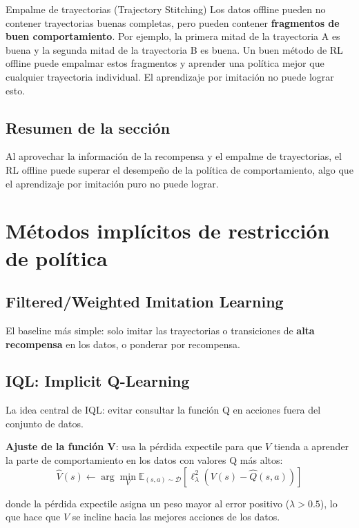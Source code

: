\documentclass[a4paper]{article}
\begin{document}
\begin{importantbox}{Empalme de trayectorias (Trajectory Stitching)}
Los datos offline pueden no contener trayectorias buenas completas, pero pueden contener \textbf{fragmentos de buen comportamiento}. Por ejemplo, la primera mitad de la trayectoria A es buena y la segunda mitad de la trayectoria B es buena. Un buen método de RL offline puede empalmar estos fragmentos y aprender una política mejor que cualquier trayectoria individual. El aprendizaje por imitación no puede lograr esto.
\end{importantbox}

\subsection{Resumen de la sección}

Al aprovechar la información de la recompensa y el empalme de trayectorias, el RL offline puede superar el desempeño de la política de comportamiento, algo que el aprendizaje por imitación puro no puede lograr.

\section{Métodos implícitos de restricción de política}

\subsection{Filtered/Weighted Imitation Learning}

El baseline más simple: solo imitar las trayectorias o transiciones de \textbf{alta recompensa} en los datos, o ponderar por recompensa.

\subsection{IQL: Implicit Q-Learning}

La idea central de IQL: evitar consultar la función Q en acciones fuera del conjunto de datos.

\textbf{Ajuste de la función V}: usa la pérdida expectile para que $V$ tienda a aprender la parte de comportamiento en los datos con valores Q más altos:
$$\hat{V}(s) \leftarrow \arg\min_{V} \mathbb{E}_{(s,a) \sim \mathcal{D}} \left[\ell_\lambda^2\left(V(s) - \hat{Q}(s, a)\right)\right]$$

donde la pérdida expectile asigna un peso mayor al error positivo ($\lambda > 0.5$), lo que hace que $V$ se incline hacia las mejores acciones de los datos.
\end{document}
